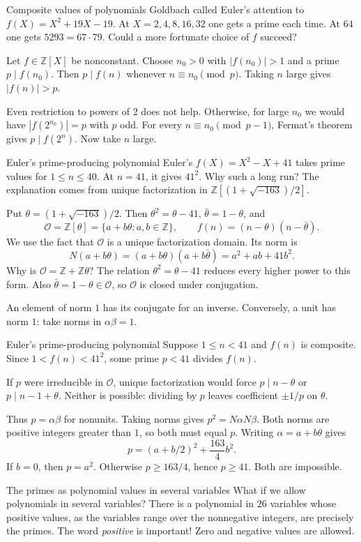 \documentclass[aspectratio=169,11pt]{beamer}
\newcommand{\Z}{\mathbb Z}
\begin{document}
\begin{frame}{Composite values of polynomials}
Goldbach called Euler's attention to $f(X)=X^2+19X-19$. At $X=2,4,8,16,32$ one gets a prime each time. At $64$ one gets $5293=67\cdot79$. Could a more fortunate choice of $f$ succeed?

Let $f\in\Z[X]$ be nonconstant. Choose $n_0>0$ with $|f(n_0)|>1$ and a prime $p\mid f(n_0)$. Then $p\mid f(n)$ whenever $n\equiv n_0\pmod p$. Taking $n$ large gives $|f(n)|>p$.

Even restriction to powers of $2$ does not help. Otherwise, for large $n_0$ we would have $|f(2^{n_0})|=p$ with $p$ odd. For every $n\equiv n_0\pmod{p-1}$, Fermat's theorem gives $p\mid f(2^n)$. Now take $n$ large.
\end{frame}
\begin{frame}{Euler's prime-producing polynomial}
Euler's $f(X)=X^2-X+41$ takes prime values for $1\le n\le40$. At $n=41$, it gives $41^2$. Why such a long run? The explanation comes from unique factorization in $\Z[(1+\sqrt{-163})/2]$.

Put $\theta=(1+\sqrt{-163})/2$. Then $\theta^2=\theta-41$, $\bar\theta=1-\theta$, and
\[\mathcal O=\Z[\theta]=\{a+b\theta:a,b\in\Z\},\qquad f(n)=(n-\theta)(n-\bar\theta).\]
We use the fact that $\mathcal O$ is a unique factorization domain. Its norm is
\[N(a+b\theta)=(a+b\theta)(a+b\bar\theta)=a^2+ab+41b^2.\]
Why is $\mathcal O=\Z+\Z\theta$? The relation $\theta^2=\theta-41$ reduces every higher power to this form. Also $\bar\theta=1-\theta\in\mathcal O$, so $\mathcal O$ is closed under conjugation.

An element of norm $1$ has its conjugate for an inverse. Conversely, a unit has norm $1$: take norms in $\alpha\beta=1$.
\end{frame}
\begin{frame}{Euler's prime-producing polynomial}
Suppose $1\le n<41$ and $f(n)$ is composite. Since $1<f(n)<41^2$, some prime $p<41$ divides $f(n)$.

If $p$ were irreducible in $\mathcal O$, unique factorization would force $p\mid n-\theta$ or $p\mid n-1+\theta$. Neither is possible: dividing by $p$ leaves coefficient $\pm1/p$ on $\theta$.

Thus $p=\alpha\beta$ for nonunits. Taking norms gives $p^2=N\alpha N\beta$. Both norms are positive integers greater than $1$, so both must equal $p$. Writing $\alpha=a+b\theta$ gives
\[p=(a+b/2)^2+\frac{163}4b^2.\]
If $b=0$, then $p=a^2$. Otherwise $p\ge163/4$, hence $p\ge41$. Both are impossible.
\end{frame}
\begin{frame}{The primes as polynomial values in several variables}
What if we allow polynomials in several variables? There is a polynomial in $26$ variables whose positive values, as the variables range over the nonnegative integers, are precisely the primes. The word \emph{positive} is important! Zero and negative values are allowed.
\end{frame}
\end{document}
